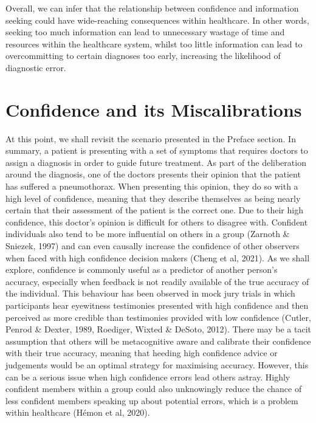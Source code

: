 \documentclass[a4paper, nobind]{templates/ociamthesis}
\begin{document}
Overall, we can infer that the relationship between confidence and information seeking could have wide-reaching consequences within healthcare. In other words, seeking too much information can lead to unnecessary wastage of time and resources within the healthcare system, whilst too little information can lead to overcommitting to certain diagnoses too early, increasing the likelihood of diagnostic error.

\hypertarget{confidence-and-its-miscalibrations}{%
\section*{Confidence and its Miscalibrations}\label{confidence-and-its-miscalibrations}}

At this point, we shall revisit the scenario presented in the Preface section. In summary, a patient is presenting with a set of symptoms that requires doctors to assign a diagnosis in order to guide future treatment. As part of the deliberation around the diagnosis, one of the doctors presents their opinion that the patient has suffered a pneumothorax. When presenting this opinion, they do so with a high level of confidence, meaning that they describe themselves as being nearly certain that their assessment of the patient is the correct one. Due to their high confidence, this doctor's opinion is difficult for others to disagree with. Confident individuals also tend to be more influential on others in a group (Zarnoth \& Sniezek, 1997) and can even causally increase the confidence of other observers when faced with high confidence decision makers (Cheng et al, 2021). As we shall explore, confidence is commonly useful as a predictor of another person's accuracy, especially when feedback is not readily available of the true accuracy of the individual. This behaviour has been observed in mock jury trials in which participants hear eyewitness testimonies presented with high confidence and then perceived as more credible than testimonies provided with low confidence (Cutler, Penrod \& Dexter, 1989, Roediger, Wixted \& DeSoto, 2012). There may be a tacit assumption that others will be metacognitive aware and calibrate their confidence with their true accuracy, meaning that heeding high confidence advice or judgements would be an optimal strategy for maximising accuracy. However, this can be a serious issue when high confidence errors lead others astray. Highly confident members within a group could also unknowingly reduce the chance of less confident members speaking up about potential errors, which is a problem within healthcare (Hémon et al, 2020).
\end{document}
